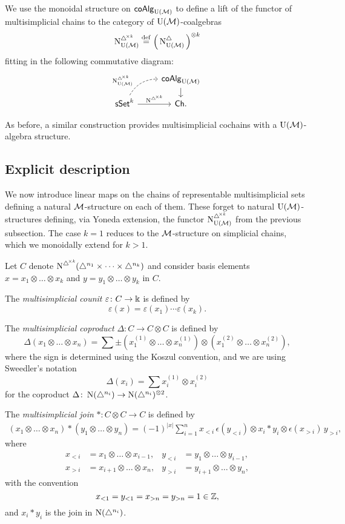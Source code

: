 We use the monoidal structure on $\mathsf{coAlg}_{\operatorname{U}(\mathcal{M})}$ to define a lift of the functor of multisimplicial chains to the category of ${\operatorname{U}(\mathcal{M})}$-coalgebras
\[
\operatorname{\operatorname{N}^{\triangle^{\!\times\mathit{k}}}_{{\operatorname{U}(\mathcal{M})}}} \stackrel{\mathrm{def}}{=} \Big(\operatorname{N^{\triangle}_{{\operatorname{U}(\mathcal{M})}}}\Big)^{\otimes k}
\]
fitting in the following commutative diagram:
\[
\begin{tikzcd}[column sep=normal, row sep=small]
& \coAlg_\UM \arrow[d] \\
\arrow[ur, "\mchainskUM", out=60, in=180, near start, dashed]
\sSet^k \arrow[r, "\mchainsk"]
& \Ch.
\end{tikzcd}
\]

As before, a similar construction provides multisimplicial cochains with a ${\operatorname{U}(\mathcal{M})}$-algebra structure.

\subsection{Explicit description}

We now introduce linear maps on the chains of representable multisimplicial sets defining a natural $\mathcal{M}$-structure on each of them.
These forget to natural ${\operatorname{U}(\mathcal{M})}$-structures defining, via Yoneda extension, the functor $\operatorname{\operatorname{N}^{\triangle^{\!\times\mathit{k}}}_{{\operatorname{U}(\mathcal{M})}}}$ from the previous subsection.
The case $k = 1$ reduces to the $\mathcal{M}$-structure on simplicial chains, which we monoidally extend for $k > 1$.

Let $C$ denote $\operatorname{\operatorname{N}^{\triangle^{\!\times\mathit{k}}}}(\triangle^{n_1} \times \dots \times \triangle^{n_k})$ and consider basis elements $x = x_1 \otimes \dots \otimes x_k$ and $y = y_1 \otimes \dots \otimes y_k$ in $C$.

The \textit{multisimplicial counit} $\varepsilon \colon C \to \Bbbk$ is defined by
\[
\varepsilon(x) = \varepsilon(x_1) \dotsm \varepsilon(x_k).
\]

The \textit{multisimplicial coproduct} $\Delta \colon C \to C \otimes C$ is defined by
\[
\Delta (x_1 \otimes \dots \otimes x_n) =
\sum \pm \left( x_1^{(1)} \otimes \dots \otimes x_n^{(1)} \right) \otimes
\left( x_1^{(2)} \otimes \dots \otimes x_n^{(2)} \right),
\]
where the sign is determined using the Koszul convention, and we are using Sweedler's notation
\[
\Delta(x_i) = \sum x_i^{(1)} \otimes x_i^{(2)}
\]
for the coproduct $\Delta \colon \operatorname{N}(\triangle^{n_i}) \to \operatorname{N}(\triangle^{n_i})^{\otimes 2}$.

The \textit{multisimplicial join} $\ast \colon C \otimes C \to C$ is defined by
\begin{align*}
(x_1 \otimes \dots \otimes x_n) \ast (y_1 \otimes \dots \otimes y_n) =
(-1)^{|x|} \sum_{i=1}^n x_{<i}\, \epsilon(y_{<i}) \otimes x_i \ast y_i \otimes \epsilon(x_{>i}) \, y_{>i},
\end{align*}
where
\begin{align*}
x_{<i} & = x_1 \otimes \dots \otimes x_{i-1}, &
y_{<i} & = y_1 \otimes \dots \otimes y_{i-1}, \\
x_{>i} & = x_{i+1} \otimes \dots \otimes x_n, &
y_{>i} & = y_{i+1} \otimes \dots \otimes y_n,
\end{align*}
with the convention
\[
x_{<1} = y_{<1} = x_{>n} = y_{>n} = 1 \in \mathbb{Z},
\]
and $x_i \ast y_i$ is the join in $\operatorname{N}(\triangle^{n_i})$.

